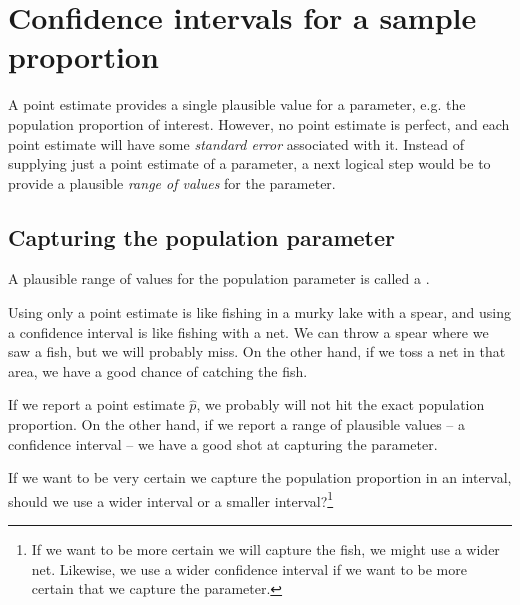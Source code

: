 \section[Confidence interval for a sample proportion]{Confidence
    intervals for a sample\\proportion} %
\label{confidenceIntervals}



A point estimate provides a single plausible value for
a parameter, e.g. the population proportion of interest.
However, no point estimate is perfect, and
each point estimate will have some \emph{standard error}
associated with it. Instead of supplying just a point
estimate of a parameter, a next logical step would be
to provide a plausible \emph{range of values} for the
parameter.

\subsection{Capturing the population parameter}

A plausible range of values for the population parameter
is called a .

Using only a point estimate is like fishing in a murky
lake with a spear, and using a confidence interval is
like fishing with a net. We can throw a spear where we
saw a fish, but we will probably miss. On the other hand,
if we toss a net in that area, we have a good chance of
catching the fish.

If we report a point estimate $\hat{p}$, we probably
will not hit the exact population proportion. On the
other hand, if we report a range of plausible values
-- a confidence interval -- we have a good shot at
capturing the parameter. 

\begin{exercise}
If we want to be very certain we capture the population
proportion in an interval, should we use a wider interval
or a smaller interval?\footnote{If we want to be more
certain we will capture the fish, we might use a
wider net. Likewise, we use a wider confidence interval
if we want to be more certain that we capture the
parameter.}
\end{exercise}

